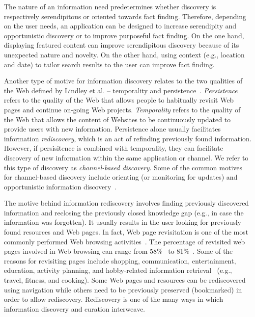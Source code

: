 \documentclass{sigchi}
\begin{document}
{{The nature of an information need predetermines whether discovery is respectively serendipitous or oriented towards fact finding. Therefore, depending on the user needs, an application can be designed to increase serendipity and opportunistic discovery or to improve purposeful fact finding. On the one hand, displaying featured content can improve serendipitous discovery because of its unexpected nature and novelty. On the other hand, using context (e.g., location and date) to tailor search results to the user can improve fact finding. 

Another type of motive for information discovery relates to the two qualities of the Web defined by Lindley et al. -- temporality and persistence~\cite{lindley2012s}. \textit{Persistence} refers to the quality of the Web that allows people to habitually revisit Web pages and continue on-going Web projects. \textit{Temporality} refers to the quality of the Web that allows the content of Websites to be continuously updated to provide users with new information. Persistence alone usually facilitates information \textit{rediscovery}, which is an act of refinding previously found information. However, if persisitence is combined with temporality, they can facilitate discovery of new information within the same application or channel. We refer to this type of discovery as \textit{channel-based discovery}. Some of the common motives for channel-based discovery include orienting (or monitoring for updates) and opportunistic information discovery~\cite{lindley2012s}.          

The motive behind information rediscovery involves finding previously discovered information and reclosing the previously closed knowledge gap (e.g., in case the information was forgotten). It usually results in the user looking for previously found resources and Web pages. In fact, Web page revisitation is one of the most commonly performed Web browsing activities~\cite{adar2008large,cockburn2003improving}. The percentage of revisited web pages involved in Web browsing can range from 58\%~\cite{tauscher1997people} to 81\%~\cite{cockburn2001web}. Some of the reasons for revisiting pages include shopping, communication, entertainment, education, activity planning, and hobby-related information retrieval~\cite{adar2008large} (e.g., travel, fitness, and cooking). Some Web pages and resources can be rediscovered using navigation while others need to be previously preserved (bookmarked) in order to allow rediscovery. Rediscovery is one of the many ways in which information discovery and curation interweave. 
}

}
\end{document}
